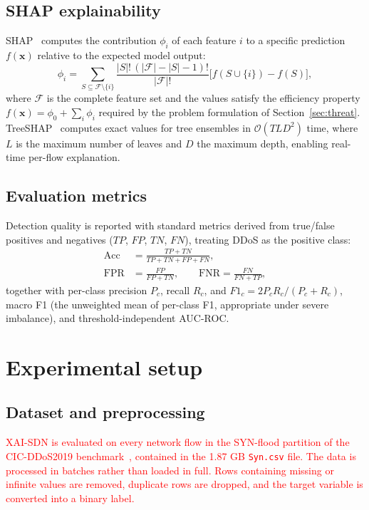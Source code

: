 \documentclass{ieeeaccess}
\begin{document}
\subsection{SHAP explainability}
SHAP~\cite{lundberg2017shap} computes the contribution $\phi_i$ of each feature $i$ to a specific prediction $f(\mathbf{x})$ relative to the expected model output:
\begin{equation}
\phi_i = \sum_{S \subseteq \mathcal{F} \setminus \{i\}} \frac{|S|!\,(|\mathcal{F}|-|S|-1)!}{|\mathcal{F}|!} \bigl[f(S \cup \{i\}) - f(S)\bigr],
\label{eq:shap}
\end{equation}
where $\mathcal{F}$ is the complete feature set and the values satisfy the efficiency property $f(\mathbf{x}) = \phi_0 + \sum_{i} \phi_i$ required by the problem formulation of Section~\ref{sec:threat}. TreeSHAP~\cite{lundberg2020treeshap} computes exact values for tree ensembles in $\mathcal{O}(TLD^2)$ time, where $L$ is the maximum number of leaves and $D$ the maximum depth, enabling real-time per-flow explanation.

\subsection{Evaluation metrics}
Detection quality is reported with standard metrics derived from true/false positives and negatives ($TP$, $FP$, $TN$, $FN$), treating DDoS as the positive class:
\begin{equation}
\begin{aligned}
\mathrm{Acc} &= \tfrac{TP+TN}{TP+TN+FP+FN}, \\
\mathrm{FPR} &= \tfrac{FP}{FP+TN}, \qquad \mathrm{FNR} = \tfrac{FN}{FN+TP},
\end{aligned}
\label{eq:metrics}
\end{equation}
together with per-class precision $P_c$, recall $R_c$, and $F1_c = 2P_cR_c/(P_c+R_c)$, macro F1 (the unweighted mean of per-class F1, appropriate under severe imbalance), and threshold-independent AUC-ROC.

\section{Experimental setup}
\label{sec:setup}

\subsection{Dataset and preprocessing}
\textcolor{red}{XAI-SDN is evaluated on every network flow in the SYN-flood partition of the CIC-DDoS2019 benchmark~\cite{sharafaldin2019ddos}, contained in the 1.87 GB \texttt{Syn.csv} file. The data is processed in batches rather than loaded in full. Rows containing missing or infinite values are removed, duplicate rows are dropped, and the target variable is converted into a binary label.}
\end{document}

